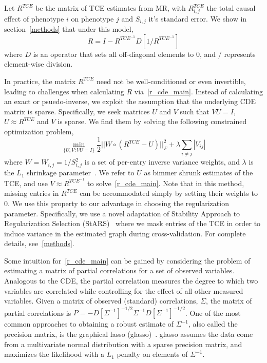 \documentclass{article}
\begin{document}
Let $R^{TCE}$ be the matrix of TCE estimates from MR, with $R^{TCE}_{i,j}$ the total
causal effect of phenotype $i$ on phenotype $j$ and $S_{i,j}$ it's standard error.
We show in section~\ref{methods} that under this model,
\begin{equation}\label{r_cde_main}
R = I - R^{TCE^{-1}} D[1 / R^{TCE^{-1}}]
\end{equation}
where $D$ is an operator that sets all off-diagonal elements to 0, and $/$
represents element-wise division.

In practice, the matrix $R^{TCE}$ need not be well-conditioned or
 even invertible, leading
to challenges when calculating $R$ via~\eqref{r_cde_main}. Instead of calculating an exact
or psuedo-inverse, we exploit the assumption that the underlying
CDE matrix is sparse. Specifically, we seek matrices $U$ and $V$ such that $VU=I$, $U \approx R^{TCE}$
and $V$ is sparse. We find them by solving the following constrained optimization problem,
\begin{equation} \label{opt_main}
\min_{\{U, V : VU = I\}} \frac{1}{2} ||W \circ (R^{TCE} - U)||_F^2 +
   \lambda \sum_{i\neq j}|V_{ij}|
\end{equation}
where $W = W_{i,j} = 1/S_{i,j}^2$ is a set of per-entry inverse variance weights,
and $\lambda$ is the $L_1$ shrinkage parameter~\cite{Friedman2007,Tishbirani1996}.
We refer to $U$ as bimmer shrunk estimates of the TCE, and
use $V \approx R^{TCE^{-1}}$ to solve~\eqref{r_cde_main}.
 Note that in this method, missing entries in $R^{TCE}$ can be accommodated simply
by setting their weights to 0. We use this property to our advantage in choosing the
regularization parameter. Specifically, we use a novel adaptation of Stability Approach
to Regularization Selection (StARS)~\cite{Liu2010} where we mask entries of the TCE
in order to induce variance in the estimated graph during cross-validation.
For complete details, see~\ref{methods}.

Some intuition for~\eqref{r_cde_main} can be gained by considering the problem
of estimating a matrix of partial correlations for a set of observed variables.
Analogous to the CDE, the partial correlation measures the degree to which two
variables are correlated while controlling for the effect of all other measured
variables. Given a matrix of observed (standard) correlations, $\Sigma$, the matrix of
partial correlations is $P = -D[\Sigma^{-1}]^{-1/2} \Sigma^{-1} D[\Sigma^{-1}]^{-1/2}$. One of
the most common approaches to obtaining a robust estimate of $\Sigma^{-1}$, also called
the precision matrix, is the graphical lasso (glasso)~\cite{Friedman2007}.
glasso assumes the data come from a multivariate normal distribution with a sparse
precision matrix, and maximizes the likelihood with a $L_1$ penalty on elements of $\Sigma^{-1}$.
\end{document}
